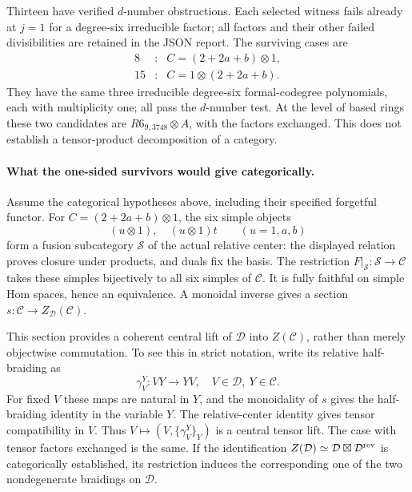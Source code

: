 \documentclass[11pt]{article}
\begin{document}
Thirteen have verified $d$-number obstructions. Each selected witness
fails already at $j=1$ for a degree-six irreducible factor; all factors
and their other failed divisibilities are retained in the JSON report.
The surviving cases are
\[
 \begin{array}{ccl}
 8 &:& C=(2+2a+b)\otimes1,\\
 15&:& C=1\otimes(2+2a+b).
 \end{array}
\]
They have the same three irreducible degree-six formal-codegree
polynomials, each with multiplicity one; all pass the $d$-number test.
At the level of based rings these two candidates are
$R6_{9,3748}\otimes A$, with the factors exchanged. This does not
establish a tensor-product decomposition of a category.

\paragraph{What the one-sided survivors would give categorically.}
Assume the categorical hypotheses above, including their specified
forgetful functor. For $C=(2+2a+b)\otimes1$, the six simple objects
\[
 (u\otimes1),\quad (u\otimes1)t\qquad(u=1,a,b)
\]
form a fusion subcategory $\mathcal S$ of the actual relative center:
the displayed relation proves closure under products, and duals fix
the basis. The restriction $F|_{\mathcal S}:\mathcal S\to\mathcal C$
takes these simples bijectively to all six simples of $\mathcal C$.
It is fully faithful on simple Hom spaces, hence an equivalence.
A monoidal inverse gives a section
$s:\mathcal C\to Z_{\mathcal D}(\mathcal C)$.

This section provides a coherent central lift of $\mathcal D$ into
$Z(\mathcal C)$, rather than merely objectwise commutation. To see
this in strict notation, write its relative half-braiding as
\[
 \gamma^Y_V:VY\longrightarrow YV,\quad
 V\in\mathcal D,\ Y\in\mathcal C.
\]
For fixed $V$ these maps are natural in $Y$, and the monoidality of
$s$ gives the half-braiding identity in the variable $Y$.
The relative-center identity gives tensor compatibility in $V$.
Thus $V\mapsto(V,\{\gamma^Y_V\}_Y)$ is a central tensor lift.
The case with tensor factors exchanged is the same. If the identification
$Z(\mathcal D)\simeq\mathcal D\boxtimes\mathcal D^{\rm rev}$ is
categorically established, its restriction induces the corresponding
one of the two nondegenerate braidings on $\mathcal D$.
\end{document}
